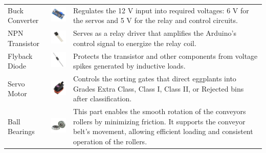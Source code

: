 {\begin{longtable}{
		>{\centering\arraybackslash}m{3cm}  
		>{\centering\arraybackslash}m{4cm} 
		>{\arraybackslash}m{6cm}
	}
	Buck Converter & \includegraphics[width=3cm]{figures/buck_converter} &
	Regulates the 12 V input into required voltages: 6 V for the servos and 5 V for the relay and control circuits. \\
	
	NPN Transistor & \includegraphics[width=3cm]{figures/transistor} &
	Serves as a relay driver that amplifies the Arduino’s control signal to energize the relay coil. \\
	
	Flyback Diode & \includegraphics[width=3cm]{figures/diode} &
	Protects the transistor and other components from voltage spikes generated by inductive loads. \\
	
	Servo Motor & \includegraphics[width=3cm]{figures/servo_motor} &
	Controls the sorting gates that direct eggplants into Grades Extra Class, Class I, Class II, or Rejected bins after classification. \\
	
	Ball Bearings & \includegraphics[width=3cm]{figures/ball_bearing} &
	This part enables the smooth rotation of the conveyors rollers by minimizing friction. It supports the conveyor belt’s movement, allowing efficient loading and consistent operation of the rollers. \\
	

\end{longtable}}
